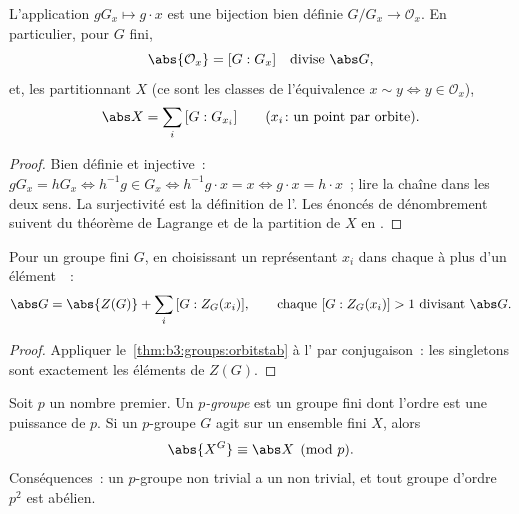 \begin{theorem}\label{thm:b3:groups:orbitstab}
L'application $gG_x \mapsto g \cdot x$ est une bijection bien
définie $G/G_x \to \mathcal O_x$. En particulier, pour $G$
fini,
\[
\abs{\mathcal O_x} = [G : G_x] \quad\text{divise } \abs G,
\]
et, les  partitionnant $X$ (ce sont les classes de
l'équivalence $x \sim y \iff y \in \mathcal O_x$),
\[
\abs X = \sum_{i} \,[G : G_{x_i}]
\qquad (x_i\colon \text{un point par orbite}).
\]
\end{theorem}

\begin{proof}
Bien définie et injective~: $gG_x = hG_x \iff h^{-1}g \in G_x
\iff h^{-1}g \cdot x = x \iff g \cdot x = h \cdot x$~; lire la
chaîne dans les deux sens. La surjectivité est la définition de
l'. Les énoncés de dénombrement suivent du théorème de
Lagrange et de la partition de $X$ en .
\end{proof}

\begin{corollary}\label{cor:b3:groups:classeq}
Pour un groupe fini $G$, en choisissant un représentant $x_i$ dans
chaque  à plus d'un élément~~:
\[
\abs G = \abs{Z(G)} + \sum_i \,[G : Z_G(x_i)],
\qquad\text{chaque } [G : Z_G(x_i)] > 1 \text{ divisant } \abs G.
\]
\end{corollary}

\begin{proof}
Appliquer le~\cref{thm:b3:groups:orbitstab} à l' par
conjugaison~: les  singletons sont exactement les éléments
de $Z(G)$.
\end{proof}

\begin{theorem}\label{thm:b3:groups:pfixed}
Soit $p$ un nombre premier. Un \emph{$p$-groupe}
est un groupe fini dont l'ordre est une puissance de $p$. Si un
$p$-groupe $G$ agit sur un ensemble fini $X$, alors
\[
\abs{X^G} \equiv \abs X \pmod p .
\]
Conséquences~: un $p$-groupe non trivial a un  non trivial,
et tout groupe d'ordre $p^2$ est abélien.
\end{theorem}

